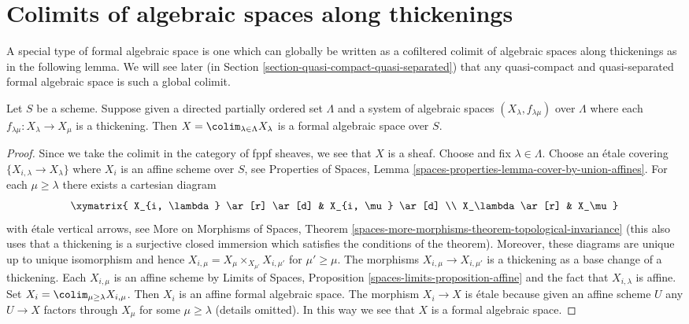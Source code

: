 \section{Colimits of algebraic spaces along thickenings}
\label{section-global-colimits}

\noindent
A special type of formal algebraic space is one which can globally
be written as a cofiltered colimit of algebraic spaces along
thickenings as in the following lemma. We will see later
(in Section \ref{section-quasi-compact-quasi-separated})
that any quasi-compact and quasi-separated formal algebraic space
is such a global colimit.

\begin{lemma}
\label{lemma-colimit-is-formal}
Let $S$ be a scheme. Suppose given a directed partially ordered set
$\Lambda$ and a system of algebraic spaces $(X_\lambda, f_{\lambda \mu})$
over $\Lambda$ where each $f_{\lambda \mu} : X_\lambda \to X_\mu$ is a
thickening. Then $X = \colim_{\lambda \in \Lambda} X_\lambda$
is a formal algebraic space over $S$.
\end{lemma}

\begin{proof}
Since we take the colimit in the category of fppf sheaves, we
see that $X$ is a sheaf. Choose and fix $\lambda \in \Lambda$. Choose an
\'etale covering $\{X_{i, \lambda} \to X_\lambda\}$ where $X_i$ is an affine
scheme over $S$, see Properties of Spaces, Lemma
\ref{spaces-properties-lemma-cover-by-union-affines}.
For each $\mu \geq \lambda$ there exists a cartesian diagram
$$
\xymatrix{
X_{i, \lambda} \ar[r] \ar[d] & X_{i, \mu} \ar[d] \\
X_\lambda \ar[r] & X_\mu
}
$$
with \'etale vertical arrows, see
More on Morphisms of Spaces, Theorem
\ref{spaces-more-morphisms-theorem-topological-invariance}
(this also uses that a thickening is a surjective closed immersion which
satisfies the conditions of the theorem). Moreover, these diagrams are
unique up to unique isomorphism and hence
$X_{i, \mu} = X_\mu \times_{X_{\mu'}} X_{i, \mu'}$ for
$\mu' \geq \mu$. The morphisms $X_{i, \mu} \to X_{i, \mu'}$
is a thickening as a base change of a thickening. Each $X_{i, \mu}$
is an affine scheme by Limits of Spaces, Proposition
\ref{spaces-limits-proposition-affine} and the fact that
$X_{i, \lambda}$ is affine.
Set $X_i = \colim_{\mu \geq \lambda} X_{i, \mu}$. Then $X_i$ is
an affine formal algebraic space. The morphism $X_i \to X$
is \'etale because given an affine scheme $U$ any $U \to X$
factors through $X_\mu$ for some $\mu \geq \lambda$ (details omitted).
In this way we see that $X$ is a formal algebraic space.
\end{proof}

